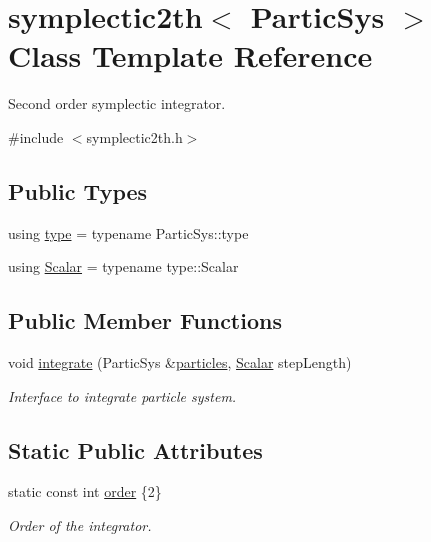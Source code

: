 \hypertarget{classsymplectic2th}{}\section{symplectic2th$<$ Partic\+Sys $>$ Class Template Reference}
\label{classsymplectic2th}


Second order symplectic integrator.  




{\ttfamily \#include $<$symplectic2th.\+h$>$}

\subsection*{Public Types}
\begin{DoxyCompactItemize}
\item 
using \mbox{\hyperlink{classsymplectic2th_a88bc0c031313c7752d9891c927641b9f}{type}} = typename Partic\+Sys\+::type
\item 
using \mbox{\hyperlink{classsymplectic2th_a801a87947fe8e90ee68759952c937ed5}{Scalar}} = typename type\+::\+Scalar
\end{DoxyCompactItemize}
\subsection*{Public Member Functions}
\begin{DoxyCompactItemize}
\item 
void \mbox{\hyperlink{classsymplectic2th_ade78f67685ed50280a210e67397af092}{integrate}} (Partic\+Sys \&\mbox{\hyperlink{classparticles}{particles}}, \mbox{\hyperlink{classsymplectic2th_a801a87947fe8e90ee68759952c937ed5}{Scalar}} step\+Length)
\begin{DoxyCompactList}\small\item\em Interface to integrate particle system. \end{DoxyCompactList}\end{DoxyCompactItemize}
\subsection*{Static Public Attributes}
\begin{DoxyCompactItemize}
\item 
static const int \mbox{\hyperlink{classsymplectic2th_a1082d668c1081ff0116e8816f1240fcd}{order}} \{2\}
\begin{DoxyCompactList}\small\item\em Order of the integrator. \end{DoxyCompactList}\end{DoxyCompactItemize}


